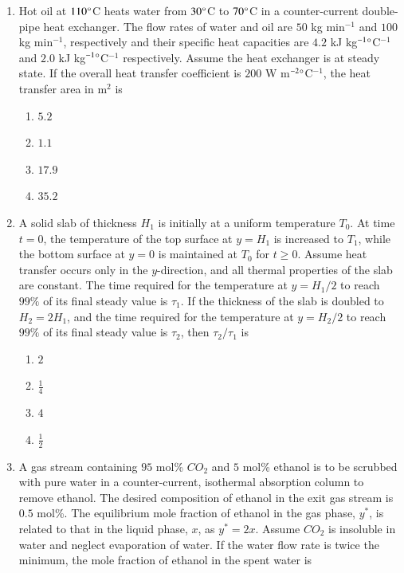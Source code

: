 \documentclass[journal,12pt,onecolumn]{IEEEtran}
\theoremstyle{remark}
\begin{document}
\begin{enumerate}
	\item Hot oil at $110\degree$C heats water from $30\degree$C to $70\degree$C in a counter-current double-pipe heat exchanger. The flow rates of water and oil are $50$ kg min$^{-1}$ and $100$ kg min$^{-1}$, respectively and their specific heat capacities are $4.2$ kJ kg$^{-1}\degree$C$^{-1}$ and $2.0$ kJ kg$^{-1}\degree$C$^{-1}$ respectively. Assume the heat exchanger is at steady state. If the overall heat transfer coefficient is $200$ W m$^{-2}\degree$C$^{-1}$, the heat transfer area in m$^2$ is
	
	\hfill{}
	\begin{enumerate}
		\item $5.2$
		\item $1.1$
		\item $17.9$
		\item $35.2$
	\end{enumerate}
	
	\item A solid slab of thickness $H_1$ is initially at a uniform temperature $T_0$. At time $t=0$, the temperature of the top surface at $y=H_1$ is increased to $T_1$, while the bottom surface at $y=0$ is maintained at $T_0$ for $t\ge0$. Assume heat transfer occurs only in the $y$-direction, and all thermal properties of the slab are constant. The time required for the temperature at $y=H_1/2$ to reach $99\%$ of its final steady value is $\tau_1$. If the thickness of the slab is doubled to $H_2=2H_1$, and the time required for the temperature at $y=H_2/2$ to reach $99\%$ of its final steady value is $\tau_2$, then $\tau_2/\tau_1$ is
	
	\hfill{}
	\begin{enumerate}
		\item $2$
		\item $\frac{1}{4}$
		\item $4$
		\item $\frac{1}{2}$
	\end{enumerate}
	
	\item A gas stream containing $95$ mol\% $CO_2$ and $5$ mol\% ethanol is to be scrubbed with pure water in a counter-current, isothermal absorption column to remove ethanol. The desired composition of ethanol in the exit gas stream is $0.5$ mol\%. The equilibrium mole fraction of ethanol in the gas phase, $y^*$, is related to that in the liquid phase, $x$, as $y^*=2x$. Assume $CO_2$ is insoluble in water and neglect evaporation of water. If the water flow rate is twice the minimum, the mole fraction of ethanol in the spent water is
	

\end{enumerate}
\end{document}
